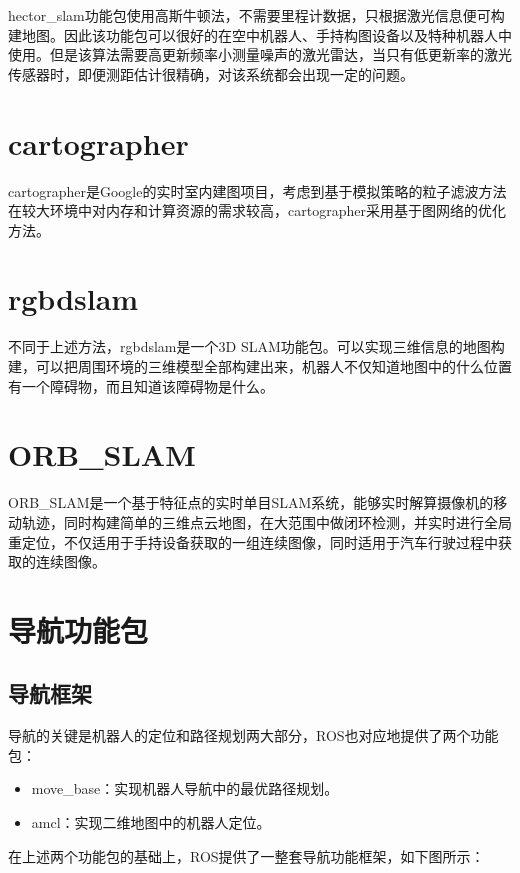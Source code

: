 \documentclass[10pt, oneside]{book}
\begin{document}
hector\_slam功能包使用高斯牛顿法，不需要里程计数据，只根据激光信息便可构建地图。因此该功能包可以很好的在空中机器人、手持构图设备以及特种机器人中使用。但是该算法需要高更新频率小测量噪声的激光雷达，当只有低更新率的激光传感器时，即便测距估计很精确，对该系统都会出现一定的问题。

\section{cartographer}

cartographer是Google的实时室内建图项目，考虑到基于模拟策略的粒子滤波方法在较大环境中对内存和计算资源的需求较高，cartographer采用基于图网络的优化方法。

\section{rgbdslam}

不同于上述方法，rgbdslam是一个3D SLAM功能包。可以实现三维信息的地图构建，可以把周围环境的三维模型全部构建出来，机器人不仅知道地图中的什么位置有一个障碍物，而且知道该障碍物是什么。

\section{ORB\_SLAM}

ORB\_SLAM是一个基于特征点的实时单目SLAM系统，能够实时解算摄像机的移动轨迹，同时构建简单的三维点云地图，在大范围中做闭环检测，并实时进行全局重定位，不仅适用于手持设备获取的一组连续图像，同时适用于汽车行驶过程中获取的连续图像。

\section{导航功能包}

\subsection{导航框架}

导航的关键是机器人的定位和路径规划两大部分，ROS也对应地提供了两个功能包：

\begin{itemize}
    \item move\_base：实现机器人导航中的最优路径规划。
    \item amcl：实现二维地图中的机器人定位。
\end{itemize}

在上述两个功能包的基础上，ROS提供了一整套导航功能框架，如下图所示：
\end{document}
